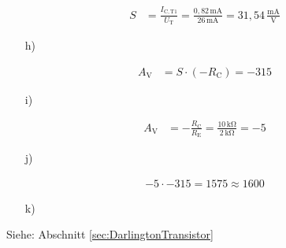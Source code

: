 {\begin{align*}
    S & = \frac{I_\mathrm{C,T1}}{U_\mathrm{T}} = \frac{0,82\,\mathrm{mA}}{26\,\mathrm{mA}} = 31,54\, \frac{\mathrm{mA}}{\mathrm{V}}
  \end{align*}
  \begin{itemize}
    \item[h)]
  \end{itemize}
  \begin{align*}
    A_\mathrm{V} & = S \cdot (-R_\mathrm{C}) = -315
  \end{align*}
  \begin{itemize}
    \item[i)]
  \end{itemize}
  \begin{align*}
    A_\mathrm{V} & = -\frac{R_\mathrm{C}}{R_\mathrm{E}} = \frac{10\,\mathrm{k\Omega}}{2\,\mathrm{k\Omega}} = -5
  \end{align*}
  \begin{itemize}
    \item[j)]
  \end{itemize}
  \begin{align*}
    -5 \cdot -315 = 1575 \approx 1600
  \end{align*}
  \begin{itemize}
    \item[k)]
  \end{itemize}
  \begin {figure} [H]
  \centering
  
  \label{fig:LsgKlausurVerbundverstaerker}
  \end {figure}
  Siehe: Abschnitt \ref{sec:DarlingtonTransistor}
}
